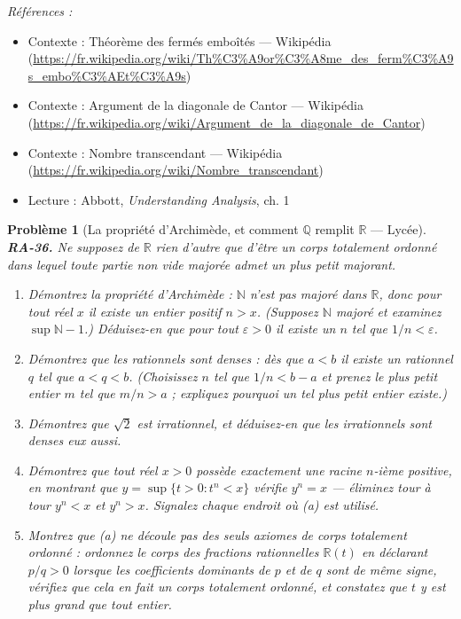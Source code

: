 \documentclass[11pt]{article}
\newtheorem{problem}{Problème}
\newenvironment{refs}{\par\small\noindent\emph{Références :}\begin{itemize}\setlength\itemsep{0pt}}{\end{itemize}\normalsize}
\begin{document}
\begin{refs}
\item Contexte : Théorème des fermés emboîtés --- Wikipédia (\url{https://fr.wikipedia.org/wiki/Th%C3%A9or%C3%A8me_des_ferm%C3%A9s_embo%C3%AEt%C3%A9s})
\item Contexte : Argument de la diagonale de Cantor --- Wikipédia (\url{https://fr.wikipedia.org/wiki/Argument_de_la_diagonale_de_Cantor})
\item Contexte : Nombre transcendant --- Wikipédia (\url{https://fr.wikipedia.org/wiki/Nombre_transcendant})
\item Lecture : Abbott, \textit{Understanding Analysis}, ch. 1
\end{refs}

\bigskip

\begin{problem}[{La propriété d'Archimède, et comment $\mathbb{Q}$ remplit $\mathbb{R}$ --- Lycée}]
\textbf{RA-36.} Ne supposez de $ \mathbb{R} $ rien d'autre que d'être un corps totalement
ordonné dans lequel toute partie non vide majorée admet un plus petit majorant.
\begin{enumerate}
\item[(a)] Démontrez la propriété d'Archimède : $ \mathbb{N} $ n'est pas majoré dans $ \mathbb{R} $,
donc pour tout réel $ x $ il existe un entier positif $ n > x $. (Supposez $ \mathbb{N} $
majoré et examinez $ \sup \mathbb{N} - 1 $.) Déduisez-en que pour tout
$ \varepsilon > 0 $ il existe un $ n $ tel que $ 1/n < \varepsilon $.
\item[(b)] Démontrez que les rationnels sont denses : dès que $ a < b $ il existe un rationnel $ q $
tel que $ a < q < b $. (Choisissez $ n $ tel que $ 1/n < b-a $ et prenez le plus petit
entier $ m $ tel que $ m/n > a $ ; expliquez pourquoi un tel plus petit entier existe.)
\item[(c)] Démontrez que $ \sqrt{2} $ est irrationnel, et déduisez-en que les irrationnels sont denses
eux aussi.
\item[(d)] Démontrez que tout réel $ x > 0 $ possède exactement une racine $ n $-ième positive, en
montrant que $ y = \sup\{ t > 0 : t^n < x \} $ vérifie $ y^n = x $ --- éliminez tour à tour
$ y^n < x $ et $ y^n > x $. Signalez chaque endroit où (a) est utilisé.
\item[(e)] Montrez que (a) ne découle pas des seuls axiomes de corps totalement ordonné : ordonnez le corps
des fractions rationnelles $ \mathbb{R}(t) $ en déclarant $ p/q > 0 $ lorsque les coefficients
dominants de $ p $ et de $ q $ sont de même signe, vérifiez que cela en fait un corps totalement
ordonné, et constatez que $ t $ y est plus grand que tout entier.
\end{enumerate}

\end{problem}
\end{document}
